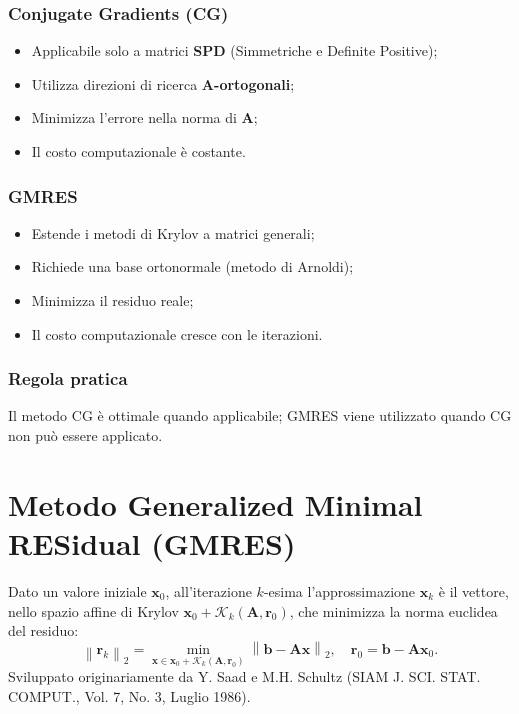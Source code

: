 \subsubsection{Conjugate Gradients (CG)}
\begin{itemize}
	\item Applicabile solo a matrici \textbf{SPD} (Simmetriche e Definite Positive);
	\item Utilizza direzioni di ricerca \textbf{A-ortogonali};
	\item Minimizza l'errore nella norma di $\mathbf{A}$;
	\item Il costo computazionale è costante.
\end{itemize}

\subsubsection{GMRES}
\begin{itemize}
	\item Estende i metodi di Krylov a matrici generali;
	\item Richiede una base ortonormale (metodo di Arnoldi);
	\item Minimizza il residuo reale;
	\item Il costo computazionale cresce con le iterazioni.
\end{itemize}

\subsubsection{Regola pratica}
Il metodo CG è ottimale quando applicabile; GMRES viene utilizzato quando CG non può essere applicato.

%
%
\section{Metodo Generalized Minimal RESidual (GMRES)}

Dato un valore iniziale $\mathbf{x}_0$, all'iterazione $k$-esima l'approssimazione $\mathbf{x}_k$ è il vettore, nello spazio affine di Krylov $\mathbf{x}_0 + \mathcal{K}_k(\mathbf{A},\mathbf{r}_0)$, che minimizza la norma euclidea del residuo:
\[
\left\| \mathbf{r}_k \right\|_2 = \min_{\mathbf{x} \in \mathbf{x}_0 + \mathcal{K}_k(\mathbf{A}, \mathbf{r}_0)} \left\| \mathbf{b} - \mathbf{A} \mathbf{x} \right\|_2, \quad \mathbf{r}_0 = \mathbf{b} - \mathbf{A} \mathbf{x}_0. 
\]
Sviluppato originariamente da Y. Saad e M.H. Schultz (SIAM J. SCI. STAT. COMPUT., Vol. 7, No. 3, Luglio 1986).

